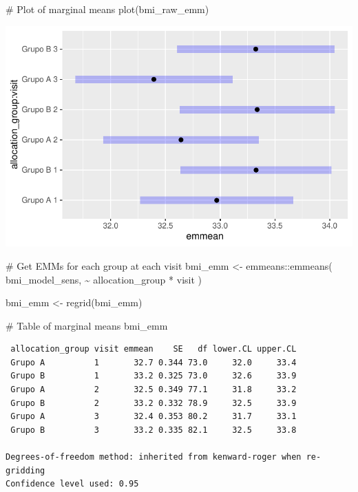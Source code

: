 \documentclass[
  letterpaper,
  DIV=11,
  numbers=noendperiod]{scrartcl}
\newenvironment{Shaded}{\begin{snugshade}}{\end{snugshade}}
\newcommand{\CommentTok}[1]{\textcolor[rgb]{0.37,0.37,0.37}{#1}}
\newcommand{\FunctionTok}[1]{\textcolor[rgb]{0.28,0.35,0.67}{#1}}
\newcommand{\NormalTok}[1]{\textcolor[rgb]{0.00,0.23,0.31}{#1}}
\newcommand{\OtherTok}[1]{\textcolor[rgb]{0.00,0.23,0.31}{#1}}
\newcommand{\SpecialCharTok}[1]{\textcolor[rgb]{0.37,0.37,0.37}{#1}}
\begin{document}
\begin{Shaded}
\begin{Highlighting}[]
\CommentTok{\# Plot of marginal means}
\FunctionTok{plot}\NormalTok{(bmi\_raw\_emm)}
\end{Highlighting}
\end{Shaded}

\includegraphics{Outcomes_V1V2V3_files/figure-pdf/bmi_raw_emm-1.pdf}

\begin{Shaded}
\begin{Highlighting}[]
\CommentTok{\# Get EMMs for each group at each visit}
\NormalTok{bmi\_emm }\OtherTok{\textless{}{-}}\NormalTok{ emmeans}\SpecialCharTok{::}\FunctionTok{emmeans}\NormalTok{(}
\NormalTok{    bmi\_model\_sens, }
    \SpecialCharTok{\textasciitilde{}}\NormalTok{ allocation\_group }\SpecialCharTok{*}\NormalTok{ visit}
\NormalTok{)}

\NormalTok{bmi\_emm }\OtherTok{\textless{}{-}} \FunctionTok{regrid}\NormalTok{(bmi\_emm)}

\CommentTok{\# Table of marginal means}
\NormalTok{bmi\_emm}
\end{Highlighting}
\end{Shaded}

\begin{verbatim}
 allocation_group visit emmean    SE   df lower.CL upper.CL
 Grupo A          1       32.7 0.344 73.0     32.0     33.4
 Grupo B          1       33.2 0.325 73.0     32.6     33.9
 Grupo A          2       32.5 0.349 77.1     31.8     33.2
 Grupo B          2       33.2 0.332 78.9     32.5     33.9
 Grupo A          3       32.4 0.353 80.2     31.7     33.1
 Grupo B          3       33.2 0.335 82.1     32.5     33.8

Degrees-of-freedom method: inherited from kenward-roger when re-gridding 
Confidence level used: 0.95 
\end{verbatim}
\end{document}

